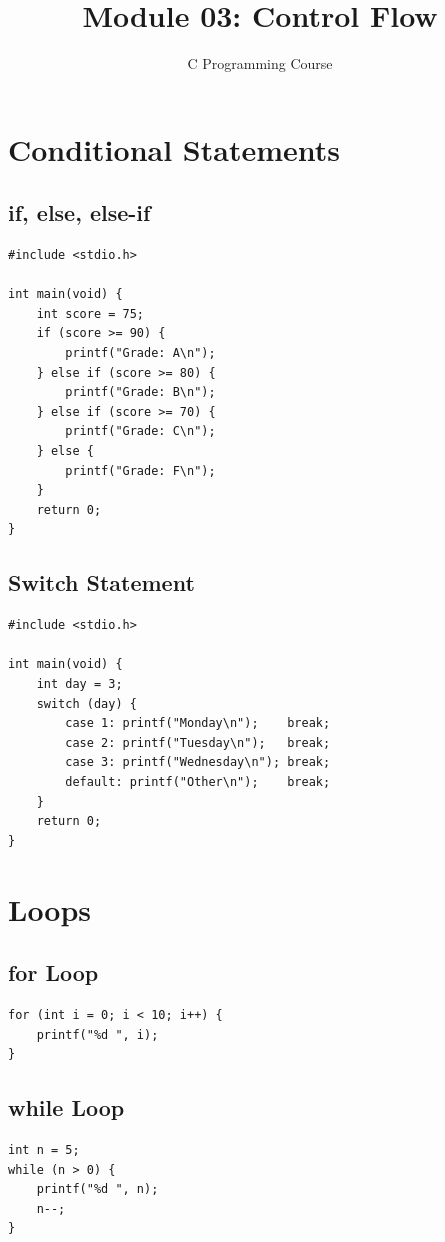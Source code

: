\documentclass[11pt,a4paper]{article}
\title{Module 03: Control Flow}
\author{C Programming Course}
\date{}
\begin{document}
\maketitle
\thispagestyle{fancy}

\section{Conditional Statements}
\subsection{if, else, else-if}
\begin{lstlisting}
#include <stdio.h>

int main(void) {
    int score = 75;
    if (score >= 90) {
        printf("Grade: A\n");
    } else if (score >= 80) {
        printf("Grade: B\n");
    } else if (score >= 70) {
        printf("Grade: C\n");
    } else {
        printf("Grade: F\n");
    }
    return 0;
}
\end{lstlisting}

\subsection{Switch Statement}
\begin{lstlisting}
#include <stdio.h>

int main(void) {
    int day = 3;
    switch (day) {
        case 1: printf("Monday\n");    break;
        case 2: printf("Tuesday\n");   break;
        case 3: printf("Wednesday\n"); break;
        default: printf("Other\n");    break;
    }
    return 0;
}
\end{lstlisting}

\section{Loops}
\subsection{for Loop}
\begin{lstlisting}
for (int i = 0; i < 10; i++) {
    printf("%d ", i);
}
\end{lstlisting}

\subsection{while Loop}
\begin{lstlisting}
int n = 5;
while (n > 0) {
    printf("%d ", n);
    n--;
}
\end{lstlisting}
\end{document}
